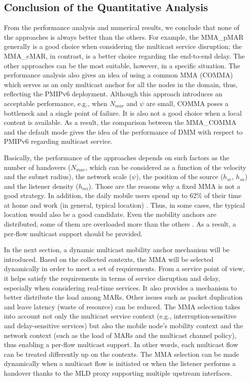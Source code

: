 \subsection{Conclusion of the Quantitative Analysis}
From the performance analysis and numerical results, we conclude that none of the approaches is always better than the others. For example, the MMA\_pMAR generally is a good choice when considering the multicast service disruption; the MMA\_cMAR, in contrast, is a better choice regarding the end-to-end delay. The other approaches can be the most suitable, however, in a specific situation. The performance analysis also gives an idea of using a common MMA (COMMA) which serves as an only multicast anchor for all the nodes in the domain, thus, reflecting the PMIPv6 deployment. Although this approach introduces an acceptable performance, e.g., when $N_{mar}$ and $\psi$ are small, COMMA poses a bottleneck and a single point of failure. It is also not a good choice when a local content is available. As a result, the comparison between the MMA\_COMMA and the default mode gives the idea of the performance of DMM with respect to PMIPv6 regarding multicast service. 

Basically, the performance of the approaches depends on such factors as the number of handovers ($N_{mar}$, which can be considered as a function of the velocity and the subnet radius), the network scale ($\psi$), the position of the source ($h_{sc}$, $h_{sa}$) and the listener density ($h_{mi}$). Those are the reasons why a fixed MMA is not a good strategy. In addition, the daily mobile users spend up to 62\% of their time at home and work (in general, typical location) \cite{cisco_connected_lives}. Thus, in some cases, the typical location would also be a good candidate. Even the mobility anchors are distributed, some of them are overloaded more than the others \cite{anchor_selection}. As a result, a per-flow multicast support should be provided. 

In the next section, a dynamic multicast mobility anchor mechanism will be introduced. Based on the collected contexts, the MMA will be selected dynamically in order to meet a set of requirements. From a service point of view, it helps satisfy the requirements in terms of service disruption and delay, especially when considering real-time services. It also provides a mechanism to better distribute the load among MARs. Other issues such as packet duplication and leave latency (waste of resource) can be reduced. The MMA selection takes into account not only the multicast service context (e.g., interruption-sensitive and delay-sensitive services) but also the mobile node’s mobility context and the network context (such as the load of MARs and the multicast channel policy), thus enabling a per-flow multicast support. In other words, each multicast flow can be treated differently up on the contexts. The MMA selection can be made dynamically when a multicast flow is initiated or when the listener performs a handover thanks to the MLD proxy supporting multiple upstream interfaces.

